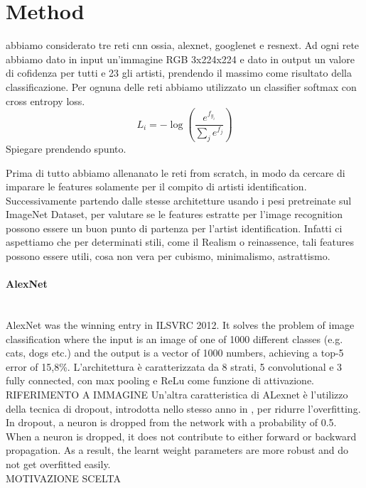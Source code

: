 \documentclass{article}
\begin{document}
\section{Method}\label{method}
abbiamo considerato tre reti cnn ossia, alexnet, googlenet e resnext.
Ad ogni rete abbiamo dato in input un'immagine RGB 3x224x224 e dato in output un valore di cofidenza per tutti e 23 gli artisti, prendendo il massimo come risultato della classificazione. 
Per ognuna delle reti abbiamo utilizzato un classifier softmax con cross entropy loss.
\begin{equation}
L_{i}=-\log \left(\frac{e^{f_{y_{i}}}}{\sum_{j} e^{f_{j}}}\right)
\end{equation}
Spiegare prendendo spunto.

Prima di tutto abbiamo allenanato le reti from scratch, in modo da cercare di imparare le features solamente per il compito di artisti identification.\\
Successivamente partendo dalle stesse architetture usando i pesi pretreinate sul ImageNet Dataset, per valutare se le features estratte per l'image recognition possono essere un buon punto di partenza per l'artist identification. Infatti ci aspettiamo che per determinati stili, come il Realism o reinassence, tali features possono essere utili, cosa non vera per cubismo, minimalismo, astrattismo.
\paragraph{AlexNet}\mbox{}\\
AlexNet was the winning entry in ILSVRC 2012. It solves the problem of image classification where the input is an image of one of 1000 different classes (e.g. cats, dogs etc.) and the output is a vector of 1000 numbers, achieving a top-5 error of 15,8\%.
L'architettura è caratterizzata da 8 strati, 5 convolutional e 3 fully connected, con max pooling e ReLu come funzione di attivazione. RIFERIMENTO A IMMAGINE
Un'altra caratteristica di ALexnet è l'utilizzo della tecnica di dropout, introdotta nello stesso anno in \cite{dropout}, per ridurre l'overfitting. 
In dropout, a neuron is dropped from the network with a probability of 0.5. When a neuron is dropped, it does not contribute to either forward or backward propagation. 
As a result, the learnt weight parameters are more robust and do not get overfitted easily. \\

MOTIVAZIONE SCELTA
\end{document}
